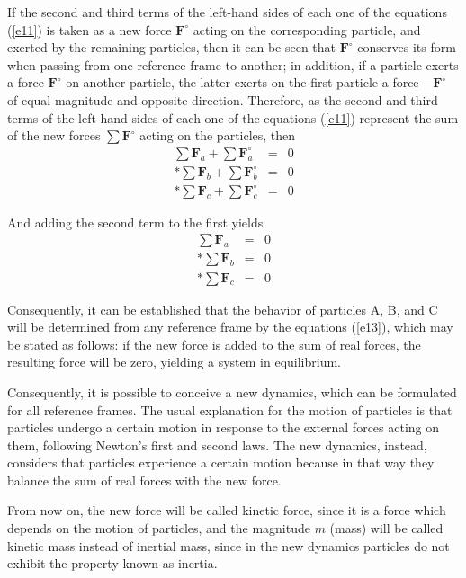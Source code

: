 \documentclass[12pt]{article}
\newcommand{\vF}{\mathbf{F}}
\newcommand{\mM}{m}
\newcommand{\ra}{_a}
\newcommand{\rb}{_b}
\newcommand{\rc}{_c}
\begin{document}
\par If the second and third terms of the left-hand sides of each one of the equations (\ref{e11}) is taken as a new force $\vF^{\circ}$ acting on the corresponding particle, and exerted by the remaining particles, then it can be seen that $\vF^{\circ}$ conserves its form when passing from one reference frame to another; in addition, if a particle exerts a force $\vF^{\circ}$ on another particle, the latter exerts on the first particle a force $-\vF^{\circ}$ of equal magnitude and opposite direction. Therefore, as the second and third terms of the left-hand sides of each one of the equations (\ref{e11}) represent the sum of the new forces $\sum \vF^{\circ}$ acting on the particles, then
\begin{eqnarray}
\sum \vF\ra + \sum \vF^{\circ}\ra & = & 0 \nonumber \\*
\sum \vF\rb + \sum \vF^{\circ}\rb & = & 0 \label{e12} \\*
\sum \vF\rc + \sum \vF^{\circ}\rc & = & 0 \nonumber
\end{eqnarray}
\par And adding the second term to the first yields
\begin{eqnarray}
\sum \vF\ra & = & 0 \nonumber \\*
\sum \vF\rb & = & 0 \label{e13} \\*
\sum \vF\rc & = & 0 \nonumber
\end{eqnarray}
\par Consequently, it can be established that the behavior of particles A, B, and C will be determined from any reference frame by the equations (\ref{e13}), which may be stated as follows: if the new force is added to the sum of real forces, the resulting force will be zero, yielding a system in equilibrium.
\par Consequently, it is possible to conceive a new dynamics, which can be formulated for all reference frames. The usual explanation for the motion of particles is that particles undergo a certain motion in response to the external forces acting on them, following Newton's first and second laws. The new dynamics, instead, considers that particles experience a certain motion because in that way they balance the sum of real forces with the new force.
\par From now on, the new force will be called kinetic force, since it is a force which depends on the motion of particles, and the magnitude $\mM$ (mass) will be called kinetic mass instead of inertial mass, since in the new dynamics particles do not exhibit the property known as inertia.
\end{document}

